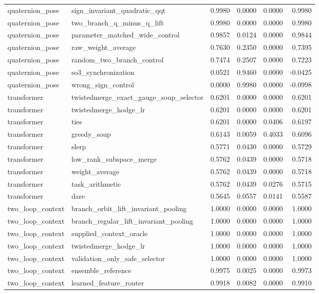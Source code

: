 \begin{tabular}{llrrrr}
quaternion_pose & sign_invariant_quadratic_qqt & 0.9980 & 0.0000 & 0.0000 & 0.9980 \\
quaternion_pose & two_branch_q_minus_q_lift & 0.9980 & 0.0000 & 0.0000 & 0.9980 \\
quaternion_pose & parameter_matched_wide_control & 0.9857 & 0.0124 & 0.0000 & 0.9844 \\
quaternion_pose & raw_weight_average & 0.7630 & 0.2350 & 0.0000 & 0.7395 \\
quaternion_pose & random_two_branch_control & 0.7474 & 0.2507 & 0.0000 & 0.7223 \\
quaternion_pose & so3_synchronization & 0.0521 & 0.9460 & 0.0000 & -0.0425 \\
quaternion_pose & wrong_sign_control & 0.0000 & 0.9980 & 0.0000 & -0.0998 \\
transformer & twistedmerge_exact_gauge_soup_selector & 0.6201 & 0.0000 & 0.0000 & 0.6201 \\
transformer & twistedmerge_hodge_lr & 0.6201 & 0.0000 & 0.0000 & 0.6201 \\
transformer & ties & 0.6201 & 0.0000 & 0.0406 & 0.6197 \\
transformer & greedy_soup & 0.6143 & 0.0059 & 0.4033 & 0.6096 \\
transformer & slerp & 0.5771 & 0.0430 & 0.0000 & 0.5729 \\
transformer & low_rank_subspace_merge & 0.5762 & 0.0439 & 0.0000 & 0.5718 \\
transformer & weight_average & 0.5762 & 0.0439 & 0.0000 & 0.5718 \\
transformer & task_arithmetic & 0.5762 & 0.0439 & 0.0276 & 0.5715 \\
transformer & dare & 0.5645 & 0.0557 & 0.0141 & 0.5587 \\
two_loop_context & branch_orbit_lift_invariant_pooling & 1.0000 & 0.0000 & 0.0000 & 1.0000 \\
two_loop_context & branch_regular_lift_invariant_pooling & 1.0000 & 0.0000 & 0.0000 & 1.0000 \\
two_loop_context & supplied_context_oracle & 1.0000 & 0.0000 & 0.0000 & 1.0000 \\
two_loop_context & twistedmerge_hodge_lr & 1.0000 & 0.0000 & 0.0000 & 1.0000 \\
two_loop_context & validation_only_safe_selector & 1.0000 & 0.0000 & 0.0000 & 1.0000 \\
two_loop_context & ensemble_reference & 0.9975 & 0.0025 & 0.0000 & 0.9973 \\
two_loop_context & learned_feature_router & 0.9918 & 0.0082 & 0.0000 & 0.9910 \\

\end{tabular}
